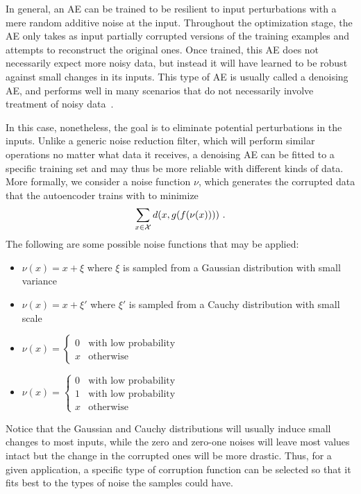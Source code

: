 In general, an AE can be trained to be resilient to input perturbations with a  mere random additive noise at the input. Throughout the optimization stage, the AE only takes as input partially corrupted versions of the training examples and attempts to reconstruct the original ones. Once trained, this AE does not necessarily expect more noisy data, but instead it will have learned to be robust against small changes in its inputs. This type of AE is usually called a denoising AE, and performs well in many scenarios that do not necessarily involve treatment of noisy data~.

In this case, nonetheless, the goal is to eliminate potential perturbations in the inputs. Unlike a generic noise reduction filter, which will perform similar operations no matter what data it receives, a denoising AE can be fitted to a specific training set and may thus be more reliable with different kinds of data. More formally, we consider a noise function $\nu$, which generates the corrupted data that the autoencoder trains with to minimize \[\sum_{x\in\mathcal X} d(x, g(f(\nu(x))))~.\] The following are some possible noise functions that may be applied:

\begin{itemize}
    \item $\nu(x)=x+\xi$ where $\xi$ is sampled from a Gaussian distribution with small variance
    \item $\nu(x)=x+\xi'$ where $\xi'$ is sampled from a Cauchy distribution with small scale
    \item $\nu(x)=\begin{cases}
        0&\mbox{with low probability}\\x&\mbox{otherwise}
    \end{cases}$
    \item $\nu(x)=\begin{cases}
        0&\mbox{with low probability}\\1&\mbox{with low probability}\\x&\mbox{otherwise}
    \end{cases}$
\end{itemize}

Notice that the Gaussian and Cauchy distributions will usually induce small changes to most inputs, while the zero and zero-one noises will leave most values intact but the change in the corrupted ones will be more drastic. Thus, for a given application, a specific type of corruption function can be selected so that it fits best to the types of noise the samples could have.

